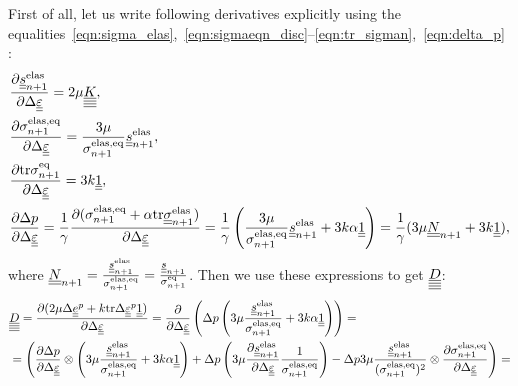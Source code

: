 \documentclass[12pt]{article}
\begin{document}
\begin{appendices}
    First of all, let us write following derivatives explicitly using the equalities~\eqref{eqn:sigma_elas},~\eqref{eqn:sigmaeqn_disc}--\eqref{eqn:tr_sigman},~\eqref{eqn:delta_p} :
    \begin{align}
        & \frac{\partial \underline{\underline{s}}_{n+1}^\text{elas}{}}{\partial \Delta\underline{\underline{\varepsilon}}} = 2\mu \underline{\underline{\underline{\underline{K}}}}, \\
        & \frac{\partial \sigma_{n+1}^\text{elas,eq}{}}{\partial \Delta\underline{\underline{\varepsilon}}} = \frac{3\mu}{\sigma_{n+1}^\text{elas,eq}}\underline{\underline{s}}_{n+1}^\text{elas}, \\
        & \frac{\partial\mathrm{tr}\sigma_{n+1}^\text{eq}}{\partial\Delta\underline{\underline{\varepsilon}}} = 3k\underline{\underline{1}}, \\
        & \frac{\partial\Delta p}{\partial\Delta\underline{\underline{\varepsilon}}} = \frac{1}{\gamma} \frac{\partial(\sigma_{n+1}^\text{elas,eq} + \alpha \mathrm{tr} \underline{\underline{\sigma}}_{n+1}^{\text{elas}})}{\partial\Delta\underline{\underline{\varepsilon}}} = \frac{1}{\gamma} \left( \frac{3\mu}{\sigma_{n+1}^\text{elas,eq}}\underline{\underline{s}}_{n+1}^\text{elas} + 3k\alpha\underline{\underline{1}} \right) = \frac{1}{\gamma}(3\mu \underline{\underline{N}}_{n+1} + 3k\underline{\underline{1}}),
    \end{align}
    where $\underline{\underline{N}}_{n+1} = \frac{\underline{\underline{s}}^\text{elas}_{n+1}}{\sigma_{n+1}^\text{elas,eq}} = \frac{\underline{\underline{s}}_{n+1}}{\sigma_{n+1}^\text{eq}}$.
    Then we use these expressions to get $\underline{\underline{\underline{\underline{D}}}}$:
    \begin{align*}
        & \uuuuD = \frac{\partial (2\mu\Delta\uue^p + k\mtr\Delta\uueps^p\uuUnit)}{\partial\Delta\uueps} = \frac{\partial }{\partial \Delta\uueps} \left( \Delta p \left( 3\mu \frac{\uusnelas}{\sigmaeqnelas} + 3k\alpha \uuUnit  \right) \right) = \\
        & = \left( \frac{\partial\Delta p}{\partial\Delta\uueps} \otimes \left( 3\mu\frac{\uusnelas}{\sigmaeqnelas} + 3k\alpha \uuUnit \right) + \Delta p \left(3\mu\frac{\partial\uusnelas}{\partial\Delta\uueps}\frac{1}{\sigmaeqnelas} \right) - \Delta p 3\mu\frac{\uusnelas}{(\sigmaeqnelas)^2} \otimes \frac{\partial\sigmaeqnelas}{\partial\Delta\uueps}\right) = \\

\end{align*}
\end{appendices}
\end{document}
